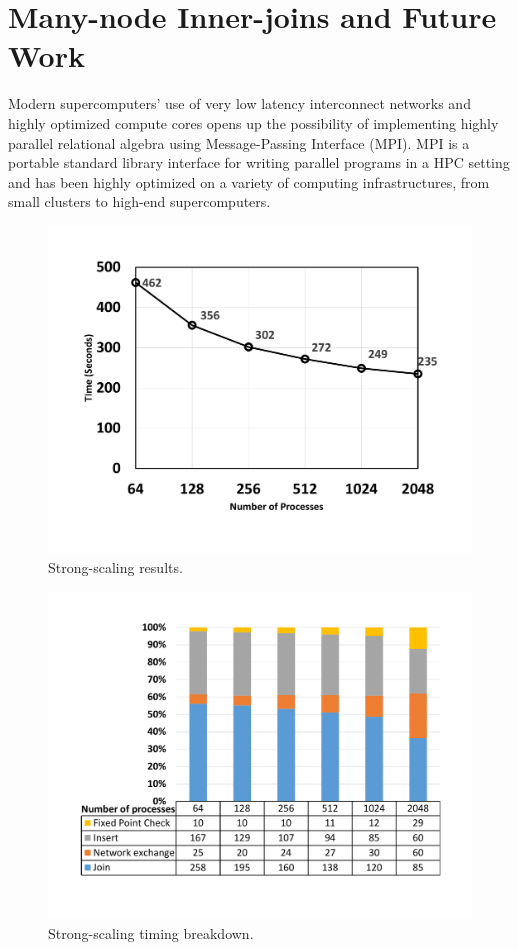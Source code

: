 
\section{Many-node Inner-joins and Future Work}
%
Modern supercomputers' use of very low latency interconnect networks and highly optimized compute cores
opens up the possibility of implementing highly parallel relational algebra using Message-Passing Interface (MPI).
MPI is a portable standard library interface for writing parallel programs in a HPC setting 
and has been highly optimized on a variety of computing infrastructures, from small clusters to high-end supercomputers. 

\begin{figure}
	\centering
	\includegraphics[trim = {25mm, 25mm, 25mm, 25mm}, width=.7\linewidth]{log/Strong_scaling.pdf}
	\caption{Strong-scaling results. \label{fig:strong_scale}}
\end{figure}
%
\begin{figure}
	\centering
	\includegraphics[trim = {25mm, 25mm, 25mm, 25mm}, width=.7\linewidth]{log/time_decomposition.pdf}
	\caption{Strong-scaling timing breakdown. \label{fig:decompose}}
\end{figure}


